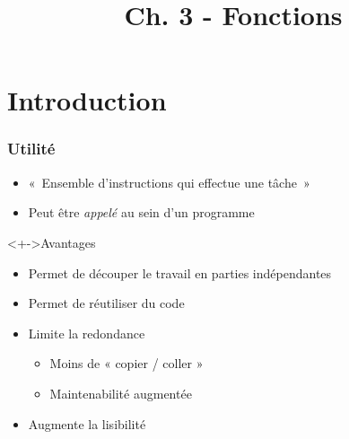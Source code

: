 


\title{Ch. 3 - Fonctions}




\section{Introduction}

\begin{frame}
\frametitle{Utilité}
\begin{itemize}[<+->]
\item «~Ensemble d'instructions qui effectue une tâche~»
\item Peut être \emph{appelé} au sein d'un programme
\end{itemize}
\begin{exampleblock}<+->{Avantages}
	\begin{itemize}[<+->]
	\item Permet de découper le travail en parties indépendantes
	\item Permet de réutiliser du code
	\item Limite la redondance
		\begin{itemize}
		\item Moins de « copier / coller »
		\item Maintenabilité augmentée
		\end{itemize}
	\item Augmente la lisibilité
	\end{itemize}
\end{exampleblock}
\end{frame}

